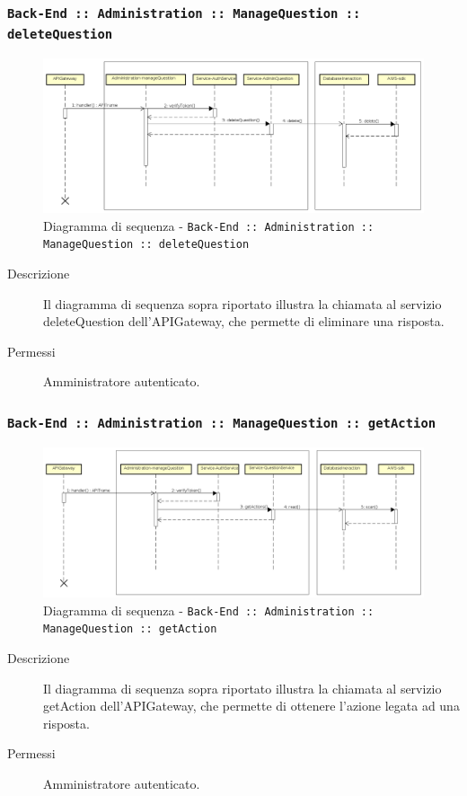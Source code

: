 \documentclass[../DefinizioneDiProdotto_v3.0.0.tex]{subfiles}
\begin{document}
\newpage
\subsubsection{\texttt{Back-End :: Administration :: ManageQuestion :: deleteQuestion}}
\begin{figure}[!h]
	\centering
	\includegraphics[width=\textwidth]{DiagrammiSequenza/Back-End/manageQuestion/deleteQuestion.png}
	\caption{Diagramma di sequenza - \texttt{Back-End :: Administration :: ManageQuestion :: deleteQuestion }}
\end{figure}
\begin{description}
	\item [Descrizione] Il diagramma di sequenza sopra riportato  illustra la chiamata al servizio deleteQuestion dell'APIGateway, che permette di eliminare una risposta.
	\item [Permessi] Amministratore autenticato.
\end{description}

\subsubsection{\texttt{Back-End :: Administration :: ManageQuestion :: getAction}}
\begin{figure}[!h]
	\centering
	\includegraphics[width=\textwidth]{DiagrammiSequenza/Back-End/manageQuestion/getAction.png}
	\caption{Diagramma di sequenza - \texttt{Back-End :: Administration :: ManageQuestion :: getAction} }
\end{figure}
\begin{description}
	\item [Descrizione] Il diagramma di sequenza sopra riportato illustra la chiamata al servizio getAction dell'APIGateway, che permette di ottenere l'azione legata ad una risposta.
	\item [Permessi] Amministratore autenticato.
\end{description}
\end{document}
